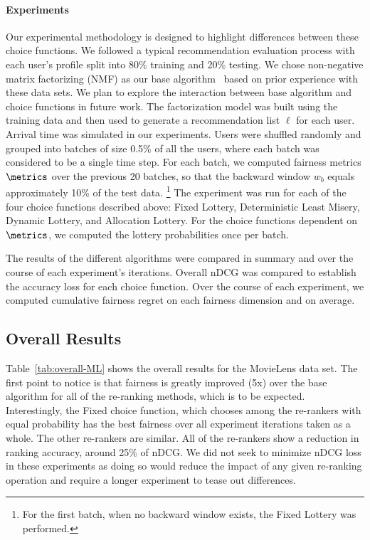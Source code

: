 \noindent \paragraph{Experiments} \newline
\indent Our experimental methodology is designed to highlight differences between these choice functions. We followed a typical recommendation evaluation process with each user's profile split into 80\% training and 20\% testing. We chose non-negative matrix factorizing (NMF) as our base algorithm~\cite{takacs2008investigation} based on prior experience with these data sets. We plan to explore the interaction between base algorithm and choice functions in future work. The factorization model was built using the training data and then used to generate a recommendation list $\ell$ for each user.
Arrival time was simulated in our experiments. Users were shuffled randomly and grouped into batches of size 0.5\% of all the users, where each batch was considered to be a single time step. For each batch, we computed fairness metrics $\metrics$ over the previous 20 batches, so that the backward window $w_b$ equals approximately 10\% of the test data. \footnote{For the first batch, when no backward window exists, the Fixed Lottery was performed.} The experiment was run for each of the four choice functions described above: Fixed Lottery, Deterministic Least Misery, Dynamic Lottery, and Allocation Lottery. For the choice functions dependent on $\metrics$, we computed the lottery probabilities once per batch. 

The results of the different algorithms were compared in summary and over the course of each experiment's iterations. Overall nDCG was compared to establish the accuracy loss for each choice function. Over the course of each experiment, we computed cumulative fairness regret on each fairness dimension and on average. 

\subsection{Overall Results}

Table~\ref{tab:overall-ML} shows the overall results for the MovieLens data set. The first point to notice is that fairness is greatly improved (5x) over the base algorithm for all of the re-ranking methods, which is to be expected. Interestingly, the Fixed choice function, which chooses among the re-rankers with equal probability has the best fairness over all experiment iterations taken as a whole. The other re-rankers are similar. All of the re-rankers show a reduction in ranking accuracy, around 25\% of nDCG. We did not seek to minimize nDCG loss in these experiments as doing so would reduce the impact of any given re-ranking operation and require a longer experiment to tease out differences.

